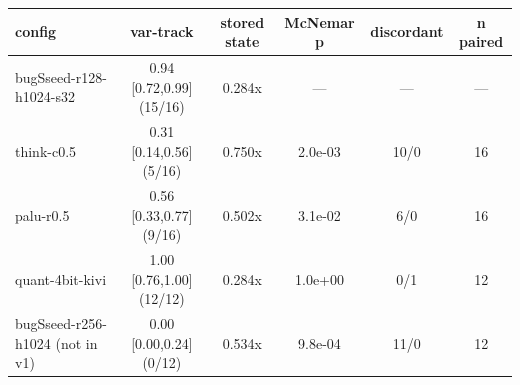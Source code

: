 \begin{tabular}{lccccc}
\toprule
config & var-track & stored state & McNemar p & discordant & n paired \\
\midrule
bugSseed-r128-h1024-s32 & 0.94 [0.72,0.99] (15/16) & 0.284x & --- & --- & --- \\
think-c0.5 & 0.31 [0.14,0.56] (5/16) & 0.750x & 2.0e-03 & 10/0 & 16 \\
palu-r0.5 & 0.56 [0.33,0.77] (9/16) & 0.502x & 3.1e-02 & 6/0 & 16 \\
quant-4bit-kivi & 1.00 [0.76,1.00] (12/12) & 0.284x & 1.0e+00 & 0/1 & 12 \\
bugSseed-r256-h1024 (not in v1) & 0.00 [0.00,0.24] (0/12) & 0.534x & 9.8e-04 & 11/0 & 12 \\
\bottomrule
\end{tabular}
